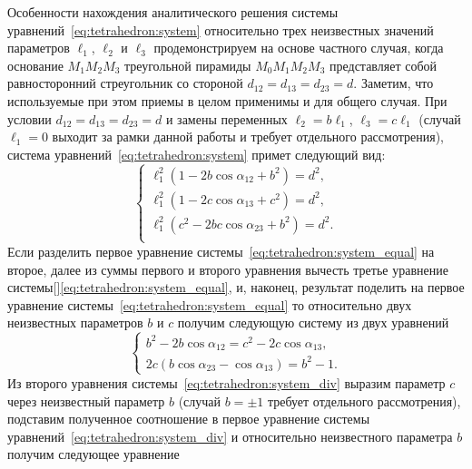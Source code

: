 \documentclass[../main.tex]{subfiles}
\begin{document}
Особенности нахождения аналитического решения системы уравнений~\eqref{eq:tetrahedron:system} относительно трех неизвестных значений параметров $\ell_1$, $\ell_2$ и $\ell_3$ продемонстрируем на основе частного случая, когда основание $M_1 M_2 M_3$ треугольной пирамиды $M_0 M_1 M_2 M_3$ представляет собой равносторонний стреугольник со стороной $d_{12} = d_{13} = d_{23} = d$. Заметим, что используемые при этом приемы в целом применимы и для общего случая. При условии $d_{12} = d_{13} = d_{23} = d$ и замены переменных $\ell_2 = b \ell_1$, $\ell_3 = c \ell_1$ (случай $\ell_1 = 0$ выходит за рамки данной работы и требует отдельного рассмотрения), система уравнений~\eqref{eq:tetrahedron:system} примет следующий вид:
\begin{equation}\label{eq:tetrahedron:system_equal}
  \begin{cases}
    \ell_1^2 \left(1 - 2b\cos\alpha_{12} + b^2\right) = d^2, \\
    \ell_1^2 \left(1 - 2c\cos\alpha_{13} + c^2\right) = d^2, \\
    \ell_1^2 \left(c^2 - 2bc\cos\alpha_{23} + b^2\right) = d^2. \\
  \end{cases}
\end{equation}
Если разделить первое уравнение системы~\eqref{eq:tetrahedron:system_equal} на второе, далее из суммы первого и второго уравнения вычесть третье уравнение системы[]\eqref{eq:tetrahedron:system_equal}, и, наконец, результат поделить на первое уравнение системы~\eqref{eq:tetrahedron:system_equal} то относительно двух неизвестных параметров $b$ и $c$ получим следующую систему из двух уравнений
\begin{equation}\label{eq:tetrahedron:system_div}
  \begin{cases}
    b^2- 2b\cos\alpha_{12} = c^2 - 2c\cos\alpha_{13}, \\
    2c \left(b\cos\alpha_{23} - \cos\alpha_{13}\right) = b^2 - 1.
  \end{cases}
\end{equation}
Из второго уравнения системы~\eqref{eq:tetrahedron:system_div} выразим параметр $c$ через неизвестный параметр $b$ (случай $b = \pm 1$ требует отдельного рассмотрения), подставим полученное соотношение в первое уравнение системы уравнений~\eqref{eq:tetrahedron:system_div} и относительно неизвестного параметра $b$ получим следующее уравнение
\end{document}

